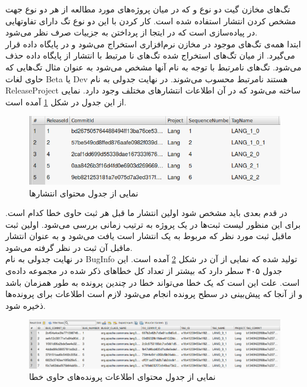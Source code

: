 تگ‌های مخازن گیت دو نوع  و  که در میان پروژه‌های مورد مطالعه از هر دو نوع جهت مشخص کردن انتشار استفاده شده است.  کار کردن با این دو نوع تگ دارای تفاوتهایی در پیاده‌سازی است که در ایتجا از پرداختن به جزییات صرف نظر می‌شود. \\ ابتدا همه‌ی تگ‌های موجود در مخازن نرم‌افزاری استخراج می‌شود و در پایگاه داده قرار می‌گیرد. از میان تگ‌های استخراج شده تگ‌های نا مرتبط با انتشار از پایگاه داده حذف می‌شود. تگ‌های نامرتبط با توجه به نام آنها مشخص می‌شود به عنوان مثال تگ‌هایی که حاوی لغات Beta یا Dev هستند نامرتبط  محسوب می‌شوند. در نهایت جدولی به نام ReleaseProject ساخته می‌شود که در آن اطلاعات انتشارهای مختلف وجود دارد. نمایی از این جدول در شکل \ref{fig:project-release} آمده است. \\
\begin{figure}[H]
	\centering
	\includegraphics[width=1\textwidth]{img/case_study/project-release.png}
	\caption{نمایی از جدول محتوای انتشارها}
	\label{fig:project-release}
\end{figure}


در قدم بعدی باید مشخص شود اولین انتشار ما قبل هر ثبت حاوی خطا کدام است. برای این منظور لیست ثبت‌ها  در یک پروژه به ترتیب زمانی بررسی می‌شود. اولین ثبت  ماقبل ثبت مورد نظر که مربوط به یک انتشار است یافت می‌شود و به عنوان انتشار ماقبل آن ثبت در نظر گرفته می‌شود. \\

 در نهایت جدولی به نام BugInfo تولید شده که نمایی از آن در شکل \ref{fig:bug-info} آمده است. این جدول ۴۰۵ سطر دارد که بیشتر از تعداد کل خطاهای ذکر شده در مجموعه داده‌ی  است. علت این است که یک خطا می‌تواند خطا در چندین پرونده به طور همزمان باشد و از آنجا که پیش‌بینی در سطح پرونده انجام می‌شود لازم است اطلاعات برای پرونده‌ها ذخیره شود.

\begin{figure}[H]
\centering
\includegraphics[width=1\textwidth]{img/case_study/bug-info.png}
\caption{نمایی از جدول محتوای اطلاعات پرونده‌های حاوی خطا}
\label{fig:bug-info}
\end{figure}

